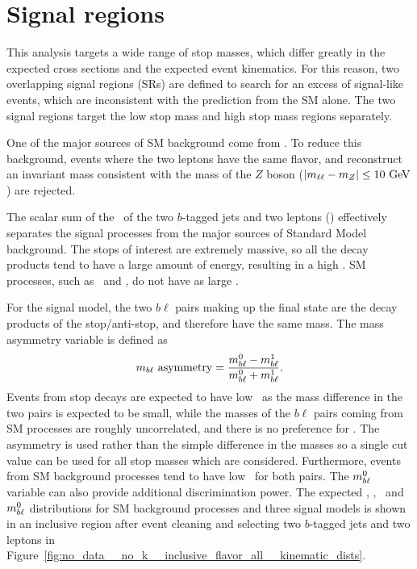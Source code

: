 \FloatBarrier
\section{Signal regions}
\label{sec:signal_regions}

This analysis targets a wide range of stop masses, which differ greatly in the
expected cross sections and the expected event kinematics.
For this reason, two overlapping signal regions (SRs) are defined to search for
an excess of signal-like events, which are inconsistent with the prediction from
the SM alone.
The two signal regions target the low stop mass and high stop mass regions
separately.

One of the major sources of SM background come from \ZGAMMAJETS.
To reduce this background, events where the two leptons have the same
flavor, and reconstruct an invariant mass consistent with the mass of the $Z$
boson ($|m_{\ell\ell} - m_{Z}| \leq 10 \GeV$) are rejected.

The scalar sum of the \pt\ of the two $b$-tagged jets and two leptons (\HT) 
effectively separates the signal processes from the major sources of
Standard Model background.
The stops of interest are extremely massive, so all the decay products tend to
have a large amount of energy, resulting in a high \HT.
SM processes, such as \TTBAR\ and \ZGAMMAJETS, do not have as large \HT.

For the signal model, the two $b\ell$ pairs making up the final state are the
decay products of the stop/anti-stop, and therefore have the same mass.
The mass asymmetry variable is defined as
\begin{equation}
  m_{b\ell}~\mathrm{asymmetry} = 
  \frac{m_{b\ell}^0-m_{b\ell}^1}{m_{b\ell}^0+m_{b\ell}^1}.
\end{equation}
Events from stop decays are expected to have low \MBLASYM\ as the mass
difference in the two pairs is expected to be small, while the masses of the
$b\ell$ pairs coming from SM processes are roughly uncorrelated, and there is
no preference for \MBLASYM.
The asymmetry is used rather than the simple difference in the masses so a
single cut value can be used for all stop masses which are considered.
Furthermore, events from SM background processes tend to have low \MBL\ for
both pairs.
The $m_{b\ell}^0$ variable can also provide additional discrimination power.
The expected \MLL, \HT, \MBLASYM\, and $m_{b\ell}^{0}$ distributions for SM
background processes and three signal models is shown in an inclusive region
after event cleaning and selecting two $b$-tagged jets and two leptons in
Figure~\ref{fig:no_data__no_k__inclusive_flavor_all__kinematic_dists}.

